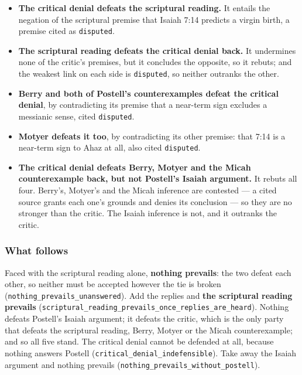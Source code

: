 \documentclass[11pt]{article}
\begin{document}
\begin{itemize}
  \item \textbf{The critical denial defeats the scriptural reading.} It entails the negation of the scriptural premise that Isaiah 7:14 predicts a virgin birth, a premise cited as \texttt{disputed}.
  \item \textbf{The scriptural reading defeats the critical denial back.} It undermines none of the critic’s premises, but it concludes the opposite, so it rebuts; and the weakest link on each side is \texttt{disputed}, so neither outranks the other.
  \item \textbf{Berry and both of Postell’s counterexamples defeat the critical denial}, by contradicting its premise that a near-term sign excludes a messianic sense, cited \texttt{disputed}.
  \item \textbf{Motyer defeats it too}, by contradicting its other premise: that 7:14 is a near-term sign to Ahaz at all, also cited \texttt{disputed}.
  \item \textbf{The critical denial defeats Berry, Motyer and the Micah counterexample back, but not Postell’s Isaiah argument.} It rebuts all four. Berry’s, Motyer’s and the Micah inference are contested — a cited source grants each one’s grounds and denies its conclusion — so they are no stronger than the critic. The Isaiah inference is not, and it outranks the critic.
\end{itemize}
\subsubsection*{What follows}
Faced with the scriptural reading alone, \textbf{nothing prevails}: the two defeat each other, so neither must be accepted however the tie is broken (\texttt{nothing\_\allowbreak{}prevails\_\allowbreak{}unanswered}). Add the replies and \textbf{the scriptural reading prevails} (\texttt{scriptural\_\allowbreak{}reading\_\allowbreak{}prevails\_\allowbreak{}once\_\allowbreak{}replies\_\allowbreak{}are\_\allowbreak{}heard}). Nothing defeats Postell’s Isaiah argument; it defeats the critic, which is the only party that defeats the scriptural reading, Berry, Motyer or the Micah counterexample; and so all five stand. The critical denial cannot be defended at all, because nothing answers Postell (\texttt{critical\_\allowbreak{}denial\_\allowbreak{}indefensible}). Take away the Isaiah argument and nothing prevails (\texttt{nothing\_\allowbreak{}prevails\_\allowbreak{}without\_\allowbreak{}postell}).
\end{document}
